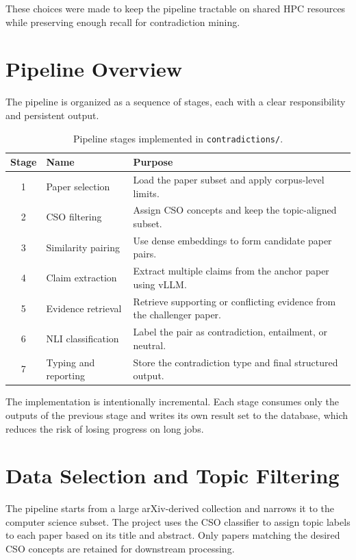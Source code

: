 \documentclass[11pt]{article}
\begin{document}
These choices were made to keep the pipeline tractable on shared HPC resources while preserving enough recall for contradiction mining.

\section{Pipeline Overview}
The pipeline is organized as a sequence of stages, each with a clear responsibility and persistent output.

\begin{table}[ht]
\centering
\caption{Pipeline stages implemented in \texttt{contradictions/}.}
\begin{tabular}{@{}clp{}@{}}
\toprule
\textbf{Stage} & \textbf{Name} & \textbf{Purpose} \\
\midrule
1 & Paper selection & Load the paper subset and apply corpus-level limits. \\
2 & CSO filtering & Assign CSO concepts and keep the topic-aligned subset. \\
3 & Similarity pairing & Use dense embeddings to form candidate paper pairs. \\
4 & Claim extraction & Extract multiple claims from the anchor paper using vLLM. \\
5 & Evidence retrieval & Retrieve supporting or conflicting evidence from the challenger paper. \\
6 & NLI classification & Label the pair as contradiction, entailment, or neutral. \\
7 & Typing and reporting & Store the contradiction type and final structured output. \\
\bottomrule
\end{tabular}
\label{tab:stages}
\end{table}

The implementation is intentionally incremental. Each stage consumes only the outputs of the previous stage and writes its own result set to the database, which reduces the risk of losing progress on long jobs.

\section{Data Selection and Topic Filtering}
The pipeline starts from a large arXiv-derived collection and narrows it to the computer science subset. The project uses the CSO classifier to assign topic labels to each paper based on its title and abstract. Only papers matching the desired CSO concepts are retained for downstream processing.
\end{document}
